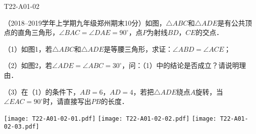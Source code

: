 \begin{defproblem}{T22-A01-02}%
\begin{onlyproblem}%
（2018--2019学年上学期九年级郑州期末10分）如图，$\triangle ABC$和$\triangle ADE$是有公共顶点的直角三角形，$\angle BAC=\angle DAE=90^{\circ }$，点$P$为射线$BD$，$CE$的交点．

（1）如图1，若$\triangle ABC$和$\triangle ADE$是等腰三角形，求证：$\angle ABD=\angle ACE$；

（2）如图2，若$\angle ADE=\angle ABC=30^{\circ }$，问：（1）中的结论是否成立？请说明理由．

（3）在（1）的条件下，$AB=6$，$AD=4$，若把$\triangle ADE$绕点$A$旋转，当$\angle EAC=90^{\circ }$时，请直接写出$PB$的长度．
\begin{center}
\texttt{[image: T22-A01-02-01.pdf]}\qquad
\texttt{[image: T22-A01-02-02.pdf]}\qquad
\texttt{[image: T22-A01-02-03.pdf]}
\end{center}

\end{onlyproblem}%
\begin{onlysolution}%
\begin{center}
\end{center}
\end{onlysolution}%
\end{defproblem}


